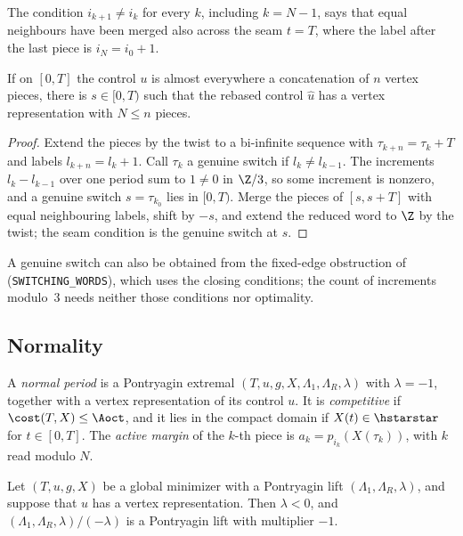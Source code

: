 The condition $i_{k+1}\ne i_k$ for every $k$, including $k=N-1$, says that equal neighbours have
been merged also across the seam $t=T$, where the label after the last piece is $i_N=i_0+1$.

\begin{lemma}\label{lem:word-reduction}
If on $[0,T]$ the control $u$ is almost everywhere a concatenation of $n$ vertex pieces, there is
$s\in[0,T)$ such that the rebased control $\hat u$ has a vertex representation with $N\le n$ pieces.
\end{lemma}

\begin{proof}
Extend the pieces by the twist to a bi-infinite sequence with $\tau_{k+n}=\tau_k+T$ and labels
$l_{k+n}=l_k+1$. Call $\tau_k$ a genuine switch if $l_k\ne l_{k-1}$. The increments
$l_k-l_{k-1}$ over one period sum to $1\ne0$ in $\Z/3$, so some increment is nonzero, and a genuine
switch $s=\tau_{k_0}$ lies in $[0,T)$. Merge the pieces of $[s,s+T]$ with equal neighbouring
labels, shift by $-s$, and extend the reduced word to $\Z$ by the twist; the seam condition is the
genuine switch at $s$.
\end{proof}

A genuine switch can also be obtained from the fixed-edge obstruction of~\cite{Notes}
(\texttt{SWITCHING\_WORDS}), which uses the closing conditions; the count of increments modulo~$3$
needs neither those conditions nor optimality.

\subsection{Normality}\label{red:normal-sec}

\begin{definition}\label{def:normal-period}
A \emph{normal period} is a Pontryagin extremal $(T,u,g,X,\Lambda_1,\Lambda_R,\lambda)$ with
$\lambda=-1$, together with a vertex representation of its control $u$. It is
\emph{competitive} if $\cost(T,X)\le\Aoct$, and it lies in the
compact domain if $X(t)\in\hstarstar$ for $t\in[0,T]$. The
\emph{active margin} of the $k$-th piece is $a_k=p_{i_k}(X(\tau_k))$, with $k$ read modulo $N$.
\end{definition}

\begin{theorem}[Normality]\label{thm:normality}
Let $(T,u,g,X)$ be a global minimizer with a Pontryagin lift $(\Lambda_1,\Lambda_R,\lambda)$, and
suppose that $u$ has a vertex representation. Then $\lambda<0$, and
$(\Lambda_1,\Lambda_R,\lambda)/(-\lambda)$ is a Pontryagin lift with multiplier $-1$.
\end{theorem}

